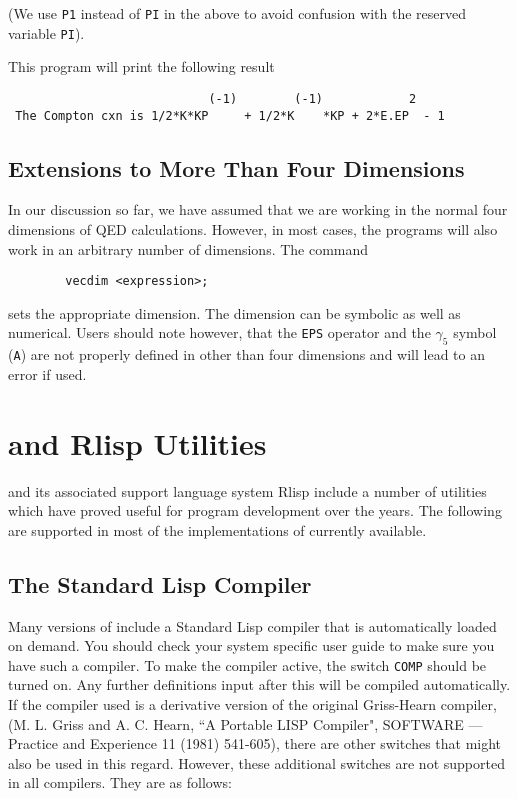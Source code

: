 (We use {\tt P1} instead of {\tt PI} in the above to avoid confusion with
the reserved variable {\tt PI}).

This program will print the following result
\begin{verbatim}
                            (-1)        (-1)            2
 The Compton cxn is 1/2*K*KP     + 1/2*K    *KP + 2*E.EP  - 1
\end{verbatim}

\section{Extensions to More Than Four Dimensions}

In our discussion so far, we have assumed that we are working in the
normal four dimensions of QED calculations. However, in most cases, the
programs will also work in an arbitrary number of dimensions. The command
\begin{verbatim}
        vecdim <expression>;
\end{verbatim}
sets the appropriate dimension. The dimension can be symbolic as well as
numerical. Users should note however, that the {\tt EPS} operator and the
$\gamma_{5}$ symbol ({\tt A}) are not properly defined in other than four
dimensions and will lead to an error if used.

\chapter{{\REDUCE} and Rlisp Utilities}

{\REDUCE} and its associated support language system Rlisp
include a number of utilities which have proved useful for program
development over the years.  The following are supported in most of the
implementations of {\REDUCE} currently available.

\section{The Standard Lisp Compiler}

Many versions of {\REDUCE} include a Standard Lisp compiler that is
automatically loaded on demand.  You should check your system specific
user guide to make sure you have such a compiler.  To make the compiler
active, the switch {\tt COMP} should be turned on.  Any
further definitions input after this will be compiled automatically.  If
the compiler used is a derivative version of the original Griss-Hearn
compiler,
(M. L. Griss and A.
C. Hearn, ``A Portable LISP Compiler", SOFTWARE --- Practice and Experience
11 (1981) 541-605),
there are other switches that might also be
used in this regard.  However, these additional switches are not supported
in all compilers.  They are as follows:

